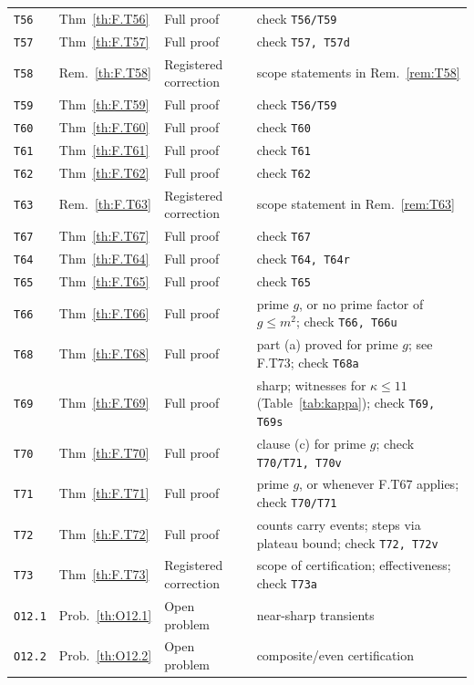 \begin{longtable}{@{}p{14mm}p{17mm}p{27mm}p{58mm}@{}}
\texttt{T56} & Thm~\ref{th:F.T56} & Full proof & check \texttt{T56/T59} \\
\texttt{T57} & Thm~\ref{th:F.T57} & Full proof & check \texttt{T57, T57d} \\
\texttt{T58} & Rem.~\ref{th:F.T58} & Registered correction & scope statements in Rem.~\ref{rem:T58} \\
\texttt{T59} & Thm~\ref{th:F.T59} & Full proof & check \texttt{T56/T59} \\
\texttt{T60} & Thm~\ref{th:F.T60} & Full proof & check \texttt{T60} \\
\texttt{T61} & Thm~\ref{th:F.T61} & Full proof & check \texttt{T61} \\
\texttt{T62} & Thm~\ref{th:F.T62} & Full proof & check \texttt{T62} \\
\texttt{T63} & Rem.~\ref{th:F.T63} & Registered correction & scope statement in Rem.~\ref{rem:T63} \\
\texttt{T67} & Thm~\ref{th:F.T67} & Full proof & check \texttt{T67} \\
\texttt{T64} & Thm~\ref{th:F.T64} & Full proof & check \texttt{T64, T64r} \\
\texttt{T65} & Thm~\ref{th:F.T65} & Full proof & check \texttt{T65} \\
\texttt{T66} & Thm~\ref{th:F.T66} & Full proof & prime $g$, or no prime factor of $g\le m^2$; check \texttt{T66, T66u} \\
\texttt{T68} & Thm~\ref{th:F.T68} & Full proof & part (a) proved for prime $g$; see F.T73; check \texttt{T68a} \\
\texttt{T69} & Thm~\ref{th:F.T69} & Full proof & sharp; witnesses for $\kappa\le11$ (Table~\ref{tab:kappa}); check \texttt{T69, T69s} \\
\texttt{T70} & Thm~\ref{th:F.T70} & Full proof & clause (c) for prime $g$; check \texttt{T70/T71, T70v} \\
\texttt{T71} & Thm~\ref{th:F.T71} & Full proof & prime $g$, or whenever F.T67 applies; check \texttt{T70/T71} \\
\texttt{T72} & Thm~\ref{th:F.T72} & Full proof & counts carry events; steps via plateau bound; check \texttt{T72, T72v} \\
\texttt{T73} & Thm~\ref{th:F.T73} & Registered correction & scope of certification; effectiveness; check \texttt{T73a} \\
\texttt{O12.1} & Prob.~\ref{th:O12.1} & Open problem & near-sharp transients \\
\texttt{O12.2} & Prob.~\ref{th:O12.2} & Open problem & composite/even certification \\

\end{longtable}
